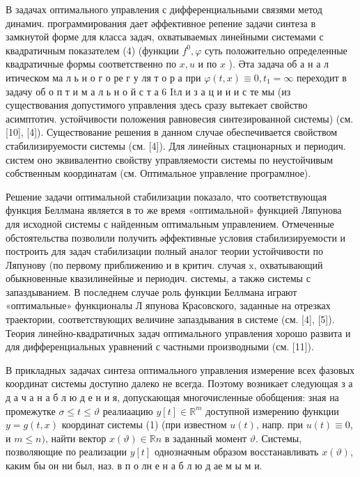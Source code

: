 \documentclass[10pt]{article}
\begin{document}
В задачах оптимального управления с дифференциальными связями метод динамич. программирования дает әффективное репение задачи синтеза в замкнутой форме для класса задач, охватываемых линейными системами с квадратичным показателем (4) (функции $f^{0}, \varphi$ суть положительно определенные квадратичные формы соответственно по $x, u$ и по $x$ ). Әта задача об а н а л итическом ма л ь н о г о ре г у ля т о р а при $\varphi(t, x) \equiv 0, t_{1}=\infty$ переходит в задачу об о п т и м а л ь н о й с т а 6 Itл и з а ц и и и с те мы (из существования допустимого управления здесь сразу вытекает свойство асимптотич. устойчивости положения равновесия синтезированной системы) (см. [10], [4]). Существование решения в данном случае обеспечивается свойством стабилизируемости системы (см. [4]). Для линейных стационарных и периодич. систем оно эквивалентно свойству управляемости системы по неустойчивым собственным координатам (см. Оптимальное управление програмлное).



Решение задачи оптимальной стабилизации показало, что соответствующая функция Беллмана является в то же время «оптимальной» функцией Ляпунова для исходной системы с найденным оптимальным управлением. Отмеченные обстоятельства позволили получить әффективные условия стабилизируемости и построить для задач стабилизации полный аналог теории устойчивости по Ляпунову (по первому приближению и в критич. случая $\mathrm{x}$, охватывающий обыкновенные квазилинейные и периодич. системы, а такжө системы с запаздыванием. В последнем случае роль функции Беллмана играют «оптимальные» функционалы Л япунова Красовского, заданные на отрезках траектории, соответствующих величине запаздывания в системе (см. [4], [5]). Теория линейно-квадратичных задач оптимального управления хорошо развита и для дифференциальных уравнений с частными производными (см. [11]).



В прикладных задачах синтеза оптимального управления измерение всех фазовых координат системы доступно далеко не всегда. Поэтому возникает следующая з а д а ч а н а б л ю д е н и я, допускающая многочисленные обобщения: зная на промежутке $\sigma \leqslant t \leqslant \vartheta$ реалиаацию $y[t] \in \mathbb{R}^{m}$ доступной измерению функции $y=g(t, x)$ координат системы (1) (при известном $u(t)$, напр. при $u(t) \equiv 0$, и $m \leqslant n)$, найти вектор $x(\vartheta) \in \mathbb{R} n$ в заданный момент $\mathfrak{\vartheta}$. Системы, позволяющие по реализации $y[t]$ однозначным образом восстанавливать $x(\vartheta)$, каким бы он ни был, наз. в п о лн е н а б л ю д ае м ы м и.
\end{document}

